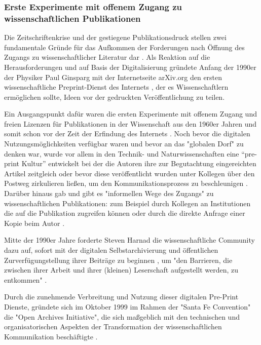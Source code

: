 \subsubsection{Erste Experimente mit offenem Zugang zu wissenschaftlichen Publikationen}

Die Zeitschriftenkrise und der gestiegene Publikationsdruck stellen zwei fundamentale Gründe für das Aufkommen der Forderungen nach Öffnung des Zugangs zu wissenschaftlicher Literatur dar \cite{Brintzinger_2010} \cite{wein_2010_erwerbung}. Als Reaktion auf die Herausforderungen und auf Basis der Digitalisierung gründete Anfang der 1990er der Physiker Paul Ginsparg mit der Internetseite arXiv.org den ersten wissenschaftliche Preprint-Dienst des Internets \cite{cite:5} \cite{bjork_2004_open}, der es Wissenschaftlern ermöglichen sollte, Ideen vor der gedruckten Veröffentlichung zu teilen.

Ein Ausgangspunkt dafür waren die ersten Experimente mit offenem Zugang und freien Lizenzen für Publikationen in der Wissenschaft aus den 1960er Jahren und somit schon vor der Zeit der Erfindung des Internets \cite{cite:18b}. Noch bevor die digitalen Nutzungsmöglichkeiten verfügbar waren und bevor an das "globalen Dorf" \cite{mcluhan_1962_gutenberg} zu denken war, wurde vor allem in den Technik- und Naturwissenschaften eine “pre-print Kultur” entwickelt bei der die Autoren ihre zur Begutachtung eingereichten Artikel zeitgleich oder bevor diese veröffentlicht wurden unter Kollegen über den Postweg zirkulieren ließen, um den Kommunikationsprozess zu beschleunigen \cite{suchen-Hoffmann-Zugang-undVerwertung-oeffentlicher-Informationen}. Darüber hinaus gab und gibt es "informellen Wege des Zugangs" zu wissenschaftlichen Publikationen: zum Beispiel durch Kollegen an Institutionen die auf die Publikation zugreifen können oder durch die direkte Anfrage einer Kopie beim Autor \cite{davis_2011_open}.

Mitte der 1990er Jahre forderte Steven Harnad die wissenschaftliche Community dazu auf, sofort mit der digitalen Selbstarchivierung und öffentlichen Zurverfügungstellung ihrer Beiträge zu beginnen \cite{albert_2006_open_implications}, um "den Barrieren, die zwischen ihrer Arbeit und ihrer (kleinen) Leserschaft aufgestellt werden, zu entkommen" \cite{harnad_1995_subversive_proposal}.

Durch die zunehmende Verbreitung und Nutzung dieser digitalen Pre-Print Dienste, gründete sich im Oktober 1999 im Rahmen der "Santa Fe Convention" die "Open Archives Initiative", die sich maßgeblich mit den technischen und organisatorischen Aspekten der Transformation der wissenschaftlichen Kommunikation beschäftigte \cite{van_2000_santa_fe}.

